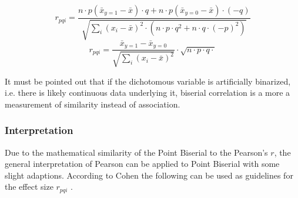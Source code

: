\documentclass[a4paper,12pt]{report}
\begin{document}
\smallskip

\begin{equation}
\label{formula_point_biserial_from_pearson}
	r_{pqi} =  \frac{n \cdot p (\bar{x}_{y=1}-\bar{x}) \cdot q + n \cdot p (\bar{x}_{y=0}-\bar{x}) \cdot (-q)}{\sqrt{\sum_{i}{(x_i-\bar{x})^2} \cdot (n \cdot p \cdot q^2 + n \cdot q \cdot (-p)^2)}}
\end{equation}
\begin{equation}
\label{formula_point_biserial}
	r_{pqi} =  \frac{\bar{x}_{y=1}-\bar{x}_{y=0}}{\sqrt{\sum_{i}{(x_i-\bar{x})^2}}} \cdot \sqrt{n \cdot p \cdot q \cdot} 
\end{equation}

\smallskip

It must be pointed out that if the dichotomous variable is artificially binarized, i.e. there is likely continuous data underlying it, biserial correlation is a more a measurement of similarity instead of association.

%
%

\subsubsection{Interpretation}
Due to the mathematical similarity of the Point Biserial to the Pearson's $r$, the general interpretation of Pearson can be applied to Point Biserial with some slight adaptions. According to Cohen \cite{Cohen1988} the following can be used as guidelines for the effect size $r_{pqi}$ \cite{Leblanc2017}.
\end{document}
